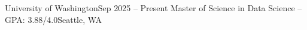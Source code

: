 \resumeSubheading
  {University of Washington}{Sep 2025 -- Present}
  {Master of Science in Data Science -- GPA: 3.88/4.0}{Seattle, WA}
  \resumeItemListStart
  \resumeItemListEnd

